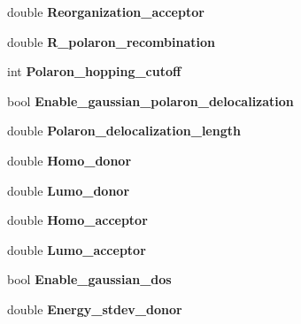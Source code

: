 \begin{DoxyCompactItemize}
double {\bfseries Reorganization\+\_\+acceptor}
\item 
\mbox{\label{struct_parameters___o_p_v_a0e55f779bf42b42e399c86914c759140}} 
double {\bfseries R\+\_\+polaron\+\_\+recombination}
\item 
\mbox{\label{struct_parameters___o_p_v_a5955354f2f5aa71d3e2fc6380b508c88}} 
int {\bfseries Polaron\+\_\+hopping\+\_\+cutoff}
\item 
\mbox{\label{struct_parameters___o_p_v_ad39e7b00fa98521b41ced155411c04cc}} 
bool {\bfseries Enable\+\_\+gaussian\+\_\+polaron\+\_\+delocalization}
\item 
\mbox{\label{struct_parameters___o_p_v_a837c9091cc25ab63dccc75e79e286f9e}} 
double {\bfseries Polaron\+\_\+delocalization\+\_\+length}
\item 
\mbox{\label{struct_parameters___o_p_v_ad46868a18b99d4bcd71dd1d69a51663d}} 
double {\bfseries Homo\+\_\+donor}
\item 
\mbox{\label{struct_parameters___o_p_v_a20bbec19017e73934b1cf68909c9171c}} 
double {\bfseries Lumo\+\_\+donor}
\item 
\mbox{\label{struct_parameters___o_p_v_ab0c38a77995655ced34190093ac1143c}} 
double {\bfseries Homo\+\_\+acceptor}
\item 
\mbox{\label{struct_parameters___o_p_v_a6fb516e12ab3e48294e13fdde4fb006c}} 
double {\bfseries Lumo\+\_\+acceptor}
\item 
\mbox{\label{struct_parameters___o_p_v_a24ccb55ce844f78e86285b10f0b1ec3a}} 
bool {\bfseries Enable\+\_\+gaussian\+\_\+dos}
\item 
\mbox{\label{struct_parameters___o_p_v_a3eb760b9191be8648c7a45998be875a4}} 
double {\bfseries Energy\+\_\+stdev\+\_\+donor}
\item 
\mbox{\label{struct_parameters___o_p_v_ad61e54053c0644fca200f803197a4550}} 

\end{DoxyCompactItemize}
